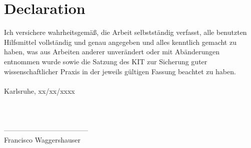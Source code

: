 \chapter*{Declaration}
Ich  versichere  wahrheitsgemäß,  die  Arbeit selbstständig  verfasst,  alle  benutzten  Hilfsmittel  voll\-ständig  und  genau  angegeben  und  alles kenntlich  gemacht  zu  haben,  was  aus  Arbeiten  anderer  unverändert  oder  mit  Abänderungen entnommen  wurde  sowie die Satzung  des  KIT  zur  Sicherung guter wissenschaftlicher Praxis in der jeweils gültigen Fassung beachtet zu haben.\\ \\
\noindent Karlsruhe,  xx/xx/xxxx
\\ \\ \\ \\
------------------------------------\\
Francisco Waggershauser


